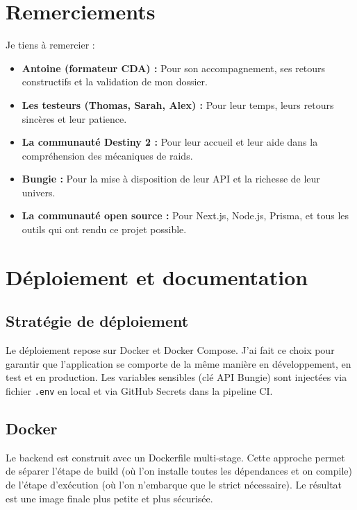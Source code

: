\section{Remerciements}

Je tiens à remercier :

\begin{itemize}
    \item \textbf{Antoine (formateur CDA) :} Pour son accompagnement, ses retours constructifs et la validation de mon dossier.
    \item \textbf{Les testeurs (Thomas, Sarah, Alex) :} Pour leur temps, leurs retours sincères et leur patience.
    \item \textbf{La communauté Destiny 2 :} Pour leur accueil et leur aide dans la compréhension des mécaniques de raids.
    \item \textbf{Bungie :} Pour la mise à disposition de leur API et la richesse de leur univers.
    \item \textbf{La communauté open source :} Pour Next.js, Node.js, Prisma, et tous les outils qui ont rendu ce projet possible.
\end{itemize}

\section{Déploiement et documentation}

\subsection*{Stratégie de déploiement}

Le déploiement repose sur Docker et Docker Compose. J'ai fait ce choix pour garantir que l'application se comporte de la même manière en développement, en test et en production. Les variables sensibles (clé API Bungie) sont injectées via fichier \texttt{.env} en local et via GitHub Secrets dans la pipeline CI.

\subsection{Docker}

Le backend est construit avec un Dockerfile multi-stage. Cette approche permet de séparer l'étape de build (où l'on installe toutes les dépendances et on compile) de l'étape d'exécution (où l'on n'embarque que le strict nécessaire). Le résultat est une image finale plus petite et plus sécurisée.


